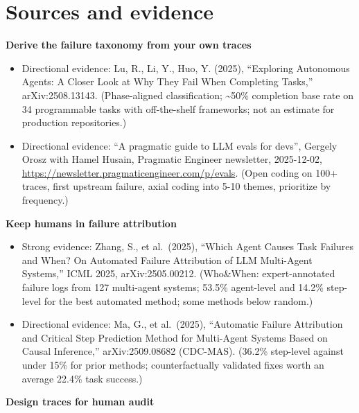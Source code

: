 \section*{Sources and evidence}

\textbf{Derive the failure taxonomy from your own traces}

\begin{itemize}
\tightlist
\item
  Directional evidence: Lu, R., Li, Y., Huo, Y. (2025), ``Exploring Autonomous Agents: A Closer Look at Why They Fail When Completing Tasks,'' arXiv:2508.13143. (Phase-aligned classification; \textasciitilde50\% completion base rate on 34 programmable tasks with off-the-shelf frameworks; not an estimate for production repositories.)
\item
  Directional evidence: ``A pragmatic guide to LLM evals for devs'', Gergely Orosz with Hamel Husain, Pragmatic Engineer newsletter, 2025-12-02, \url{https://newsletter.pragmaticengineer.com/p/evals}. (Open coding on 100+ traces, first upstream failure, axial coding into 5-10 themes, prioritize by frequency.)
\end{itemize}

\textbf{Keep humans in failure attribution}

\begin{itemize}
\tightlist
\item
  Strong evidence: Zhang, S., et al.~(2025), ``Which Agent Causes Task Failures and When? On Automated Failure Attribution of LLM Multi-Agent Systems,'' ICML 2025, arXiv:2505.00212. (Who\&When: expert-annotated failure logs from 127 multi-agent systems; 53.5\% agent-level and 14.2\% step-level for the best automated method; some methods below random.)
\item
  Directional evidence: Ma, G., et al.~(2025), ``Automatic Failure Attribution and Critical Step Prediction Method for Multi-Agent Systems Based on Causal Inference,'' arXiv:2509.08682 (CDC-MAS). (36.2\% step-level against under 15\% for prior methods; counterfactually validated fixes worth an average 22.4\% task success.)
\end{itemize}

\textbf{Design traces for human audit}

